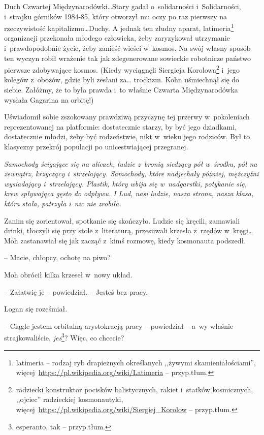 \documentclass[oneside,polish,11pt,sfheadings]{mwbk}
\begin{document}
Duch Czwartej Międzynarodówki\ldots Stary gadał o~solidarności i~Solidarności, i~strajku górników 1984-85, który otworzył mu oczy po raz
pierwszy na rzeczywistość kapitalizmu\ldots Duchy. A jednak ten złudny
aparat, latimeria\footnote{latimeria -- rodzaj ryb drapieżnych określanych
,,żywymi skamieniałościami'',
więcej~\url{https://pl.wikipedia.org/wiki/Latimeria} --
przyp.tłum.} organizacji przekonała młodego człowieka, żeby zaryzykował
utrzymanie i~prawdopodobnie życie, żeby zanieść wieści w~kosmos. Na swój
własny sposób ten wyczyn robił wrażenie tak jak zdegenerowane sowieckie
robotnicze państwo pierwsze zdobywające kosmos. (Kiedy wyciągnęli
Siergieja Korolowa\footnote{radziecki konstruktor pocisków balistycznych,
rakiet i~statków kosmicznych, ,,ojciec'' radzieckiej kosmonautyki,
więcej~\url{https://pl.wikipedia.org/wiki/Siergiej\_Korolow} -- przyp.tłum.} i~jego kolegów z~obozów, gdzie byli zesłani za\ldots
trockizm. Kohn uśmiechnął się do siebie. Załóżmy, że to była prawda i~to
właśnie Czwarta Międzynarodówka wysłała Gagarina na orbitę!)

Uświadomił sobie zszokowany prawdziwą przyczynę tej przerwy w~pokoleniach reprezentowanej na platformie: dostatecznie starzy, by być
jego dziadkami, dostatecznie młodzi, żeby być rodzeństwie, nikt w~wieku
jego rodziców. Był to klasyczny przekrój populacji po unicestwiającej
przegranej.

\emph{Samochody ścigające się na ulicach, ludzie z~bronią siedzący pół w~środku, pół na zewnątrz, krzyczący i~strzelający. Samochody, które
nadjechały później, mężczyźni wysiadający i~strzelający. Plastik, który
wbija się w~nadgarstki, potykanie się, krew spływająca gęsto do odpływu.
I Lud, nasi ludzie, nasza strona, nasza klasa, która stała, patrzyła i~nic nie zrobiła.}

Zanim się zorientował, spotkanie się skończyło. Ludzie się kręcili,
zamawiali drinki, tłoczyli się przy stole z~literaturą, przesuwali
krzesła z~rzędów w~kręgi\ldots Moh zastanawiał się jak zacząć z~kimś
rozmowę, kiedy kosmonauta podszedł.

-- Macie, chłopcy, ochotę na piwo?

Moh obrócił kilka krzeseł w~nowy układ. 

-- Załatwię je -- powiedział. -- Jesteś bez pracy.

Logan się roześmiał. 

-- Ciągle jestem orbitalną arystokracją pracy -- powiedział -- a~wy właśnie strajkowaliście, \emph{jes}\footnote{ esperanto, tak
-- przyp.tłum.}? Więc, co chcecie?
\end{document}
